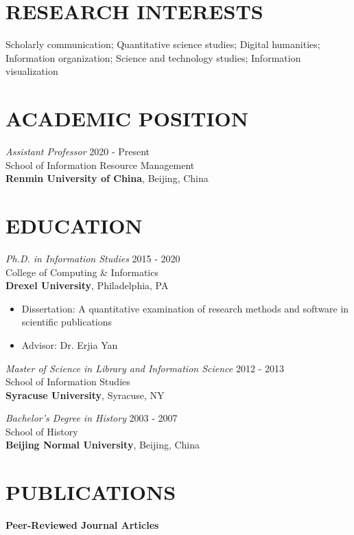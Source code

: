 \documentclass[margin, 10pt]{res} %
\begin{document}
\begin{resume}


\section{RESEARCH INTERESTS}  

Scholarly communication; Quantitative science studies; Digital humanities; Information organization; Science and technology studies; Information visualization

\section{ACADEMIC POSITION}
{\sl Assistant Professor} \hfill 2020 - Present \\
School of Information Resource Management\\
\textbf{Renmin University of China}, Beijing, China

\section{EDUCATION}

{\sl Ph.D. in Information Studies} \hfill 2015 - 2020 \\
College of Computing \& Informatics\\
\textbf{Drexel University}, Philadelphia, PA
\begin{itemize}
\item Dissertation: A quantitative examination of research methods and software in scientific publications
\item Advisor: Dr. Erjia Yan
\end{itemize} 

{\sl Master of Science in Library and Information Science} \hfill 2012 - 2013 \\
School of Information Studies\\
\textbf{Syracuse University}, Syracuse, NY
 
{\sl Bachelor’s Degree in History} \hfill 2003 - 2007\\
School of History\\
\textbf{Beijing Normal University}, Beijing, China

\section{PUBLICATIONS}

\textbf{Peer-Reviewed Journal Articles}


\end{resume}
\end{document}
